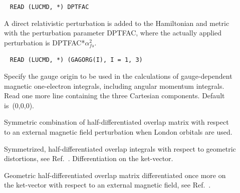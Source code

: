 \begin{description}
\item[]\verb| |\newline
\verb|READ (LUCMD, *) DPTFAC|

A direct relativistic perturbation is added to the
  Hamiltonian and metric with the perturbation parameter DPTFAC, where
  the actually applied perturbation is DPTFAC*$\alpha_{fs}^2$.

\item[]\verb| |\newline
\verb|READ (LUCMD, *) (GAGORG(I), I = 1, 3)|

Specify the gauge origin to be used in the
calculations of gauge-dependent magnetic one-electron integrals,
including angular momentum integrals.
Read one more line containing the three Cartesian components. Default is~(0,0,0).

\item[] Symmetric combination of half-differentiated
  overlap matrix with respect to an external magnetic field
  perturbation when London orbitals are used.


\item[] Symmetrized, half-differentiated
overlap integrals with respect to geometric
distortions, see
Ref.~\cite{klbpjhjajjothjcp97}. Differentiation on the ket-vector.


\item[] Geometric half-differentiated overlap
matrix
differentiated once more on the ket-vector with respect to an external
magnetic field, see Ref.~\cite{klbpjthkrhjajjcp98}.


\end{description}
